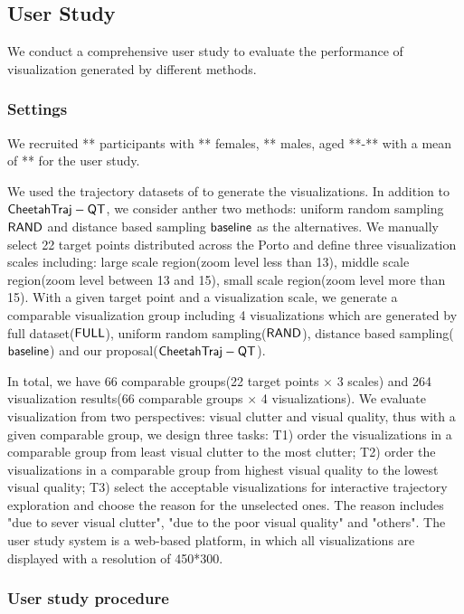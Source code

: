 \subsection{User Study}\label{sec:user}

We conduct a comprehensive user study to evaluate the performance of visualization generated by different methods.

\subsubsection{Settings}
We recruited ** participants with ** females, ** males, aged **-** with a mean of ** for the user study.

We used the trajectory datasets of \pt{} to generate the visualizations.
In addition to $\mathsf{CheetahTraj}-\mathsf{QT}$, we consider anther two methods: uniform random sampling $\mathsf{RAND}$ and distance based sampling $\mathsf{baseline}$ as the alternatives.
We manually select 22 target points distributed across the Porto and define three visualization scales including:
large scale region(zoom level less than 13), middle scale region(zoom level between 13 and 15), small scale region(zoom level more than 15).
With a given target point and a visualization scale,
we generate a comparable visualization group including 4 visualizations which are generated by full dataset($\mathsf{FULL}$), uniform random sampling($\mathsf{RAND}$), distance based sampling($\mathsf{baseline}$) and our proposal($\mathsf{CheetahTraj}-\mathsf{QT}$).

In total, we have 66 comparable groups(22 target points $\times$ 3 scales) and 264 visualization results(66 comparable groups $\times$ 4 visualizations).
We evaluate visualization from two perspectives: visual clutter and visual quality, thus with a given comparable group, we design three tasks:
T1) order the visualizations in a comparable group from least visual clutter to the most clutter;
T2) order the visualizations in a comparable group from highest visual quality to the lowest visual quality;
T3) select the acceptable visualizations for interactive trajectory exploration and choose the reason for the unselected ones. The reason includes "due to sever visual clutter", "due to the poor visual quality" and "others".
The user study system is a web-based platform, in which all visualizations are displayed with a resolution of 450*300.

\subsubsection{User study procedure}

